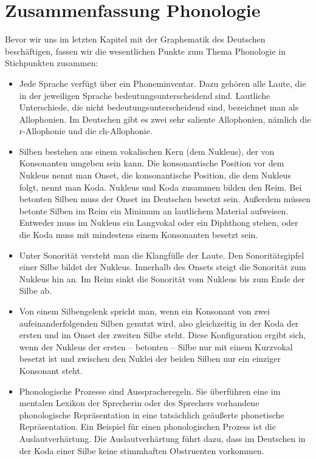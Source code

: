 \section{Zusammenfassung Phonologie}

Bevor wir uns im letzten Kapitel mit der Graphematik des Deutschen beschäftigen, fassen wir die wesentlichen Punkte zum Thema Phonologie in Stichpunkten zusammen:

\begin{itemize}

\item Jede Sprache verfügt über ein Phoneminventar. Dazu gehören alle Laute, die in der jeweiligen Sprache bedeutungsunterscheidend sind. Lautliche Unterschiede, die nicht bedeutungsunterscheidend sind, bezeichnet man als Allophonien. Im Deutschen gibt es zwei sehr saliente Allophonien, nämlich die r-Allophonie und die ch-Allophonie.

\item Silben bestehen aus einem vokalischen Kern (dem Nukleus), der von Konsonanten umgeben sein kann. Die konsonantische Position vor dem Nukleus nennt man Onset, die konsonantische Position, die dem Nukleus folgt, nennt man Koda. Nukleus und Koda zusammen bilden den Reim. Bei betonten Silben muss der Onset im Deutschen besetzt sein. Außerdem müssen betonte Silben im Reim ein Minimum an lautlichem Material aufweisen. Entweder muss im Nukleus ein Langvokal oder ein Diphthong stehen, oder die Koda muss mit mindestens einem Konsonanten besetzt sein. 

\item Unter Sonorität versteht man die Klangfülle der Laute. Den Sonoritätsgipfel einer Silbe bildet der Nukleus. Innerhalb des Onsets steigt die Sonorität zum Nukleus hin an. Im Reim sinkt die Sonorität vom Nukleus bis zum Ende der Silbe ab.


\item Von einem Silbengelenk spricht man, wenn ein Konsonant von zwei aufeinanderfolgenden Silben genutzt wird, also gleichzeitig in der Koda der ers\-ten und im Onset der zweiten Silbe steht. Diese Konfiguration ergibt sich, wenn der Nukleus der ersten -- betonten -- Silbe nur mit einem Kurzvokal besetzt ist und zwischen den Nuklei der beiden Silben nur ein einziger Konsonant steht.

\item Phonologische Prozesse sind Ausspracheregeln. Sie überführen eine im mentalen Lexikon der Sprecherin oder des Sprechers vorhandene phonologische Repräsentation in eine tatsächlich geäußerte phonetische Repräsentation. Ein Beispiel für einen phonologischen Prozess ist die Auslautverhärtung. Die Auslautverhärtung führt dazu, dass im Deutschen in der Koda einer Silbe keine stimmhaften Obstruenten vorkommen.

\end{itemize}

